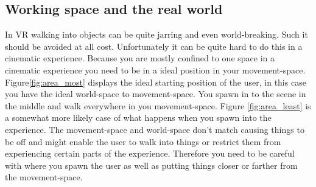 \documentclass{report}
\begin{document}
				\subsection{Working space and the real world}
				In VR walking into objects can be quite jarring and even world-breaking. Such it should be avoided at all cost. Unfortunately it can be quite hard to do this in a cinematic experience. Because you are mostly confined to one space in a cinematic experience you need to be in a ideal position in your movement-space. Figure\ref{fig:area_most} displays the ideal starting position of the user, in this case you have the ideal world-space to movement-space. You spawn in to the scene in the middle and walk everywhere in you movement-space. Figure \ref{fig:area_least} is a somewhat more likely case of what happens when you spawn into the experience. The movement-space and world-space don't match causing things to be off and might enable the user to walk into things or restrict them from experiencing certain parts of the experience. Therefore you need to be careful with where you spawn the user as well as putting things closer or farther from the movement-space. 
				
\end{document}
